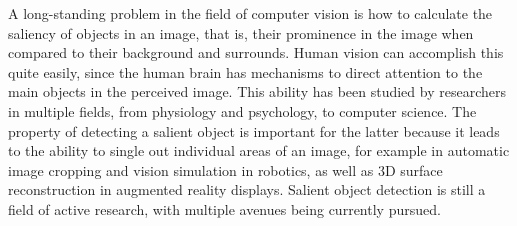 \documentclass[10pt,twocolumn,letterpaper]{article}
\newcommand{\BOLD}{\textbf}
\begin{document}
A long-standing problem in the field of computer vision is how to calculate the saliency of objects in an image, that is, their prominence in the image when compared to their background and surrounds.  Human vision can accomplish this quite easily, since the human brain has mechanisms to direct attention to the main objects in the perceived image.  This ability has been studied by researchers in multiple fields, from physiology and psychology, to computer science.  The property of detecting a salient object is important for the latter because it leads to the ability to single out individual areas of an image, for example in automatic image cropping and vision simulation in robotics, as well as 3D surface reconstruction in augmented reality displays.  Salient object detection is still a field of active research, with multiple avenues being currently pursued.  
\end{document}
